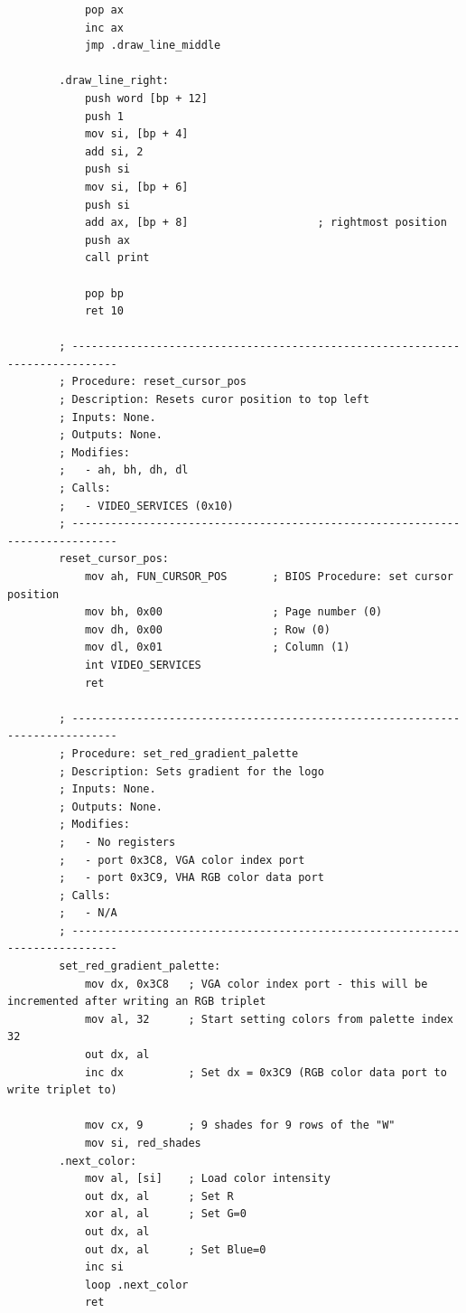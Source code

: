 \documentclass{article}
\begin{document}
\begin{lstlisting}
            pop ax
            inc ax
            jmp .draw_line_middle

        .draw_line_right:
            push word [bp + 12]
            push 1
            mov si, [bp + 4]
            add si, 2
            push si
            mov si, [bp + 6]
            push si
            add ax, [bp + 8]                    ; rightmost position
            push ax
            call print

            pop bp
            ret 10

        ; -----------------------------------------------------------------------------
        ; Procedure: reset_cursor_pos
        ; Description: Resets curor position to top left
        ; Inputs: None.
        ; Outputs: None.
        ; Modifies:
        ;   - ah, bh, dh, dl
        ; Calls:
        ;   - VIDEO_SERVICES (0x10)
        ; -----------------------------------------------------------------------------
        reset_cursor_pos:
            mov ah, FUN_CURSOR_POS       ; BIOS Procedure: set cursor position
            mov bh, 0x00                 ; Page number (0)
            mov dh, 0x00                 ; Row (0)
            mov dl, 0x01                 ; Column (1)
            int VIDEO_SERVICES
            ret

        ; -----------------------------------------------------------------------------
        ; Procedure: set_red_gradient_palette
        ; Description: Sets gradient for the logo
        ; Inputs: None.
        ; Outputs: None.
        ; Modifies:
        ;   - No registers
        ;   - port 0x3C8, VGA color index port
        ;   - port 0x3C9, VHA RGB color data port
        ; Calls:
        ;   - N/A
        ; -----------------------------------------------------------------------------
        set_red_gradient_palette:
            mov dx, 0x3C8   ; VGA color index port - this will be incremented after writing an RGB triplet
            mov al, 32      ; Start setting colors from palette index 32
            out dx, al
            inc dx          ; Set dx = 0x3C9 (RGB color data port to write triplet to)

            mov cx, 9       ; 9 shades for 9 rows of the "W"
            mov si, red_shades
        .next_color:
            mov al, [si]    ; Load color intensity
            out dx, al      ; Set R
            xor al, al      ; Set G=0
            out dx, al
            out dx, al      ; Set Blue=0
            inc si
            loop .next_color
            ret


\end{lstlisting}
\end{document}
